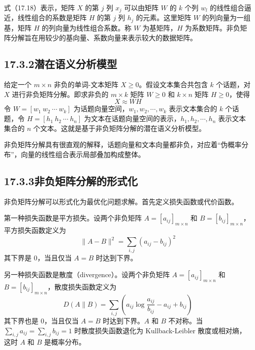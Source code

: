 \documentclass[UTF8,12pt,a4paper,fontset=fandol]{ctexart}
\begin{document}
式（17.18）表示，矩阵 $X$ 的第 $j$ 列 $x_j$ 可以由矩阵 $W$ 的 $k$ 个列 $w_l$ 的线性组合逼近，线性组合的系数是矩阵 $H$ 的第 $j$ 列 $h_j$ 的元素。这里矩阵 $W$ 的列向量为一组基，矩阵 $H$ 的列向量为线性组合系数。称 $W$ 为基矩阵，$H$ 为系数矩阵。非负矩阵分解旨在用较少的基向量、系数向量来表示较大的数据矩阵。

\subsection*{17.3.2\quad 潜在语义分析模型}

给定一个 $m\times n$ 非负的单词-文本矩阵 $X\geqslant 0$。假设文本集合共包含 $k$ 个话题，对 $X$ 进行非负矩阵分解。即求非负的 $m\times k$ 矩阵 $W\geqslant 0$ 和 $k\times n$ 矩阵 $H\geqslant 0$，使得
\begin{equation}
X\approx WH
\tag{17.19}
\end{equation}
令 $W=[w_1\ w_2\ \cdots\ w_k]$ 为话题向量空间，$w_1,w_2,\cdots,w_k$ 表示文本集合的 $k$ 个话题，令 $H=[h_1\ h_2\ \cdots\ h_n]$ 为文本在话题向量空间的表示，$h_1,h_2,\cdots,h_n$ 表示文本集合的 $n$ 个文本。这就是基于非负矩阵分解的潜在语义分析模型。

非负矩阵分解具有很直观的解释，话题向量和文本向量都非负，对应着“伪概率分布”，向量的线性组合表示局部叠加构成整体。

\subsection*{17.3.3\quad 非负矩阵分解的形式化}

非负矩阵分解可以形式化为最优化问题求解。首先定义损失函数或代价函数。

第一种损失函数是平方损失。设两个非负矩阵 $A=[a_{ij}]_{m\times n}$ 和 $B=[b_{ij}]_{m\times n}$，平方损失函数定义为
\begin{equation}
\|A-B\|^2=\sum_{i,j}(a_{ij}-b_{ij})^2
\tag{17.20}
\end{equation}
其下界是 0，当且仅当 $A=B$ 时达到下界。

另一种损失函数是散度（divergence）。设两个非负矩阵 $A=[a_{ij}]_{m\times n}$ 和 $B=[b_{ij}]_{m\times n}$，散度损失函数定义为
\begin{equation}
D(A\|B)=\sum_{i,j}\left(a_{ij}\log\frac{a_{ij}}{b_{ij}}-a_{ij}+b_{ij}\right)
\tag{17.21}
\end{equation}
其下界也是 0，当且仅当 $A=B$ 时达到下界。$A$ 和 $B$ 不对称。当 $\sum_{i,j}a_{ij}=\sum_{i,j}b_{ij}=1$ 时散度损失函数退化为 Kullback-Leibler 散度或相对熵，这时 $A$ 和 $B$ 是概率分布。
\end{document}

